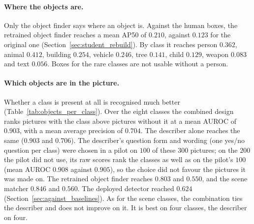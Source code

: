 \paragraph{Where the objects are.} Only the object finder says where an object is. Against the human boxes, the retrained object finder reaches a mean AP50 of $0.210$, against $0.123$ for the original one (Section~\ref{sec:student_rebuild}). By class it reaches person $0.362$, animal $0.412$, building $0.254$, vehicle $0.246$, tree $0.141$, child $0.129$, weapon $0.083$ and text $0.056$. Boxes for the rare classes are not usable without a person.

\paragraph{Which objects are in the picture.} Whether a class is present at all is recognised much better (Table~\ref{tab:objects_per_class}). Over the eight classes the combined design ranks pictures with the class above pictures without it at a mean AUROC of $0.903$, with a mean average precision of $0.704$. The describer alone reaches the same ($0.903$ and $0.706$). The describer's question form and wording (one yes/no question per class) were chosen in a pilot on $100$ of these $300$ pictures; on the $200$ the pilot did not use, its raw scores rank the classes as well as on the pilot's $100$ (mean AUROC $0.908$ against $0.905$), so the choice did not favour the pictures it was made on. The retrained object finder reaches $0.803$ and $0.550$, and the scene matcher $0.846$ and $0.560$. The deployed detector reached $0.624$ (Section~\ref{sec:against_baselines}). As for the scene classes, the combination ties the describer and does not improve on it. It is best on four classes, the describer on four.


